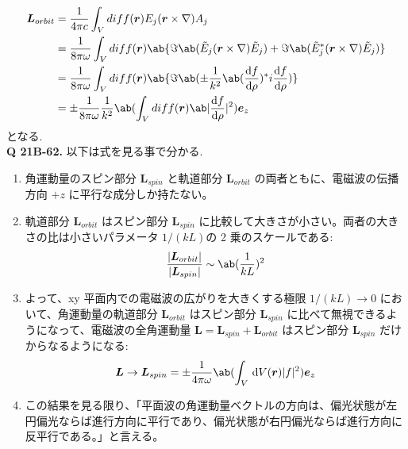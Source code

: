 \documentclass[uplatex,dvipdfmx,a4paper,11pt]{jlreq}
\newcommand{\rr}{\bm{r}}
\newcommand{\Et}{\tilde{E}}
\newcommand{\LL}{\bm{L}}
\newcommand{\vnabla}{\mathbf{\nabla}}
\theoremstyle{definition}
\begin{document}
\begin{align}
  \LL_{orbit} & = \frac{1}{4\pi c}\int_Vdiff(\rr)E_j(\rr\times\nabla)A_j                                                                  \\
              & = \frac{1}{8\pi\omega}\int_Vdiff(\rr)\ab\{\Im\ab(\Et_j(\rr\times\vnabla)\Et_j) + \Im\ab(\Et_j^*(\rr\times\vnabla)\Et_j)\} \\
              & = \frac{1}{8\pi\omega}\int_Vdiff(\rr)\ab\{\Im\ab(\pm\frac{1}{k^2}\ab(\diff{f}{\rho})^*i\diff{f}{\rho})\}                  \\
              & = \pm\frac{1}{8\pi\omega}\frac{1}{k^2}\ab(\int_Vdiff(\rr)\ab|\diff{f}{\rho}|^2)\bm{e}_z
\end{align}
となる. \\

\textbf{Q 21B-62.}
以下は式を見る事で分かる.
\begin{enumerate}
  \item 角運動量のスピン部分 $\LL_{spin}$ と軌道部分 $\LL_{orbit}$ の両者ともに、電磁波の伝播方向 $+z$ に平行な成分しか持たない。
  \item 軌道部分 $\LL_{orbit}$ はスピン部分 $\LL_{spin}$ に比較して大きさが小さい。両者の大きさの比は小さいパラメータ $1/(kL)$の 2 乗のスケールである:
        \begin{align}
          \frac{|\LL_{orbit}|}{|\LL_{spin}|} \sim \ab(\frac{1}{kL})^2
        \end{align}
  \item よって、xy 平面内での電磁波の広がりを大きくする極限 $1/(kL) \to 0$ において、角運動量の軌道部分 $\LL_{orbit}$ はスピン部分 $\LL_{spin}$ に比べて無視できるようになって、電磁波の全角運動量 $\LL = \LL_{spin} + \LL_{orbit}$ はスピン部分 $\LL_{spin}$ だけからなるようになる:
        \begin{align}
          \LL \to \LL_{spin} = \pm \frac{1}{4\pi\omega}\ab(\int_V\dl V(\rr)|f|^2)\bm{e}_z \label{L limit}
        \end{align}
  \item この結果を見る限り、「平面波の角運動量ベクトルの方向は、偏光状態が左円偏光ならば進行方向に平行であり、偏光状態が右円偏光ならば進行方向に反平行である。」と言える。
\end{enumerate}
\end{document}
